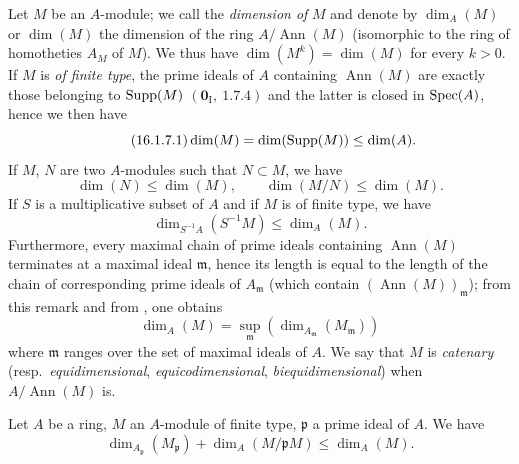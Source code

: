 \begin{env}[16.1.7]
\label{0.16.1.7}
Let $M$ be an $A$-module; we call the \emph{dimension of} $M$ and denote by $\dim_A(M)$ or $\dim(M)$ the dimension of the ring $A/\operatorname{Ann}(M)$ (isomorphic to the ring of homotheties $A_M$ of $M$).
We thus have $\dim(M^k)=\dim(M)$ for every $k>0$.
If $M$ is \emph{of finite type}, the prime ideals of $A$ containing $\operatorname{Ann}(M)$ are exactly those belonging to $\operatorname{Supp}(M)$ $(\mathbf{0}_\mathrm{I},~1.7.4)$ and the latter is closed in $\operatorname{Spec}(A)$, hence we then have
\begin{equation}
\label{0.16.1.7.1}
\tag{16.1.7.1}
  \dim(M)=\dim(\operatorname{Supp}(M))\leq\dim(A).
\end{equation}
If $M$, $N$ are two $A$-modules such that $N\subset M$, we have
\begin{equation}
\label{0.16.1.7.2}
\tag{16.1.7.2}
  \dim(N)\leq\dim(M),\qquad\dim(M/N)\leq\dim(M).
\end{equation}
If $S$ is a multiplicative subset of $A$ and if $M$ is of finite type, we have
\begin{equation}
\label{0.16.1.7.3}
\tag{16.1.7.3}
  \dim_{S^{-1}A}(S^{-1}M)\leq\dim_A(M).
\end{equation}
Furthermore, every maximal chain of prime ideals containing $\operatorname{Ann}(M)$ terminates at a maximal ideal $\mathfrak{m}$, hence its length is equal to the length of the chain of corresponding prime ideals of $A_\mathfrak{m}$ (which contain $(\operatorname{Ann}(M))_\mathfrak{m}$); from this remark and from , one obtains
\begin{equation}
\label{0.16.1.7.4}
\tag{16.1.7.4}
  \dim_A(M)=\sup_\mathfrak{m}(\dim_{A_\mathfrak{m}}(M_\mathfrak{m}))
\end{equation}
where $\mathfrak{m}$ ranges over the set of maximal ideals of $A$.
We say that $M$ is \emph{catenary} (resp.~\emph{equidimensional}, \emph{equicodimensional}, \emph{biequidimensional}) when $A/\operatorname{Ann}(M)$ is.
\end{env}

\begin{proposition}[16.1.8]
\label{0.16.1.8}
Let $A$ be a ring, $M$ an $A$-module of finite type, $\mathfrak{p}$ a prime ideal of $A$.
We have
\begin{equation}
\label{0.16.1.8.1}
\tag{16.1.8.1}
  \dim_{A_\mathfrak{p}}(M_\mathfrak{p})+\dim_A(M/\mathfrak{p}M)\leq\dim_A(M).
\end{equation}
\end{proposition}

